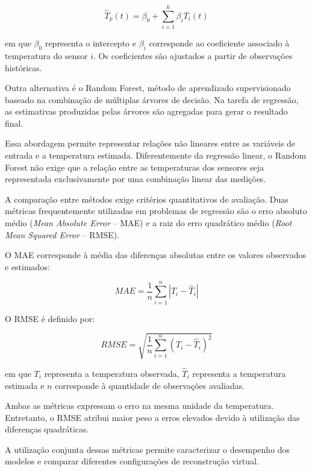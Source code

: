 \begin{equation}
    \hat{T}_{p}(t) =
    \beta_0 +
    \sum_{i=1}^{k} \beta_i T_i(t)
    \label{eq:regressao_linear}
\end{equation}

\noindent
em que $\beta_0$ representa o intercepto e $\beta_i$
corresponde ao coeficiente associado à temperatura
do sensor $i$. Os coeficientes são ajustados a partir
de observações históricas.

Outra alternativa é o Random Forest, método de aprendizado
supervisionado baseado na combinação de múltiplas árvores
de decisão. Na tarefa de regressão, as estimativas produzidas
pelas árvores são agregadas para gerar o resultado final.

Essa abordagem permite representar relações não lineares
entre as variáveis de entrada e a temperatura estimada.
Diferentemente da regressão linear, o Random Forest não
exige que a relação entre as temperaturas dos sensores
seja representada exclusivamente por uma combinação
linear das medições.

A comparação entre métodos exige critérios quantitativos
de avaliação. Duas métricas frequentemente utilizadas em
problemas de regressão são o erro absoluto médio
(\textit{Mean Absolute Error} -- MAE) e a raiz do erro
quadrático médio (\textit{Root Mean Squared Error} -- RMSE).

O MAE corresponde à média das diferenças absolutas
entre os valores observados e estimados:

\begin{equation}
    MAE =
    \frac{1}{n}
    \sum_{i=1}^{n}
    \left|T_i-\hat{T}_i\right|
    \label{eq:mae}
\end{equation}

O RMSE é definido por:

\begin{equation}
    RMSE =
    \sqrt{
        \frac{1}{n}
        \sum_{i=1}^{n}
        \left(T_i-\hat{T}_i\right)^2
    }
    \label{eq:rmse}
\end{equation}

\noindent
em que $T_i$ representa a temperatura observada, $\hat{T}_i$ representa a temperatura estimada e $n$ corresponde à quantidade de observações avaliadas.

Ambas as métricas expressam o erro na mesma unidade da temperatura. Entretanto, o RMSE atribui maior peso a erros elevados devido à utilização das diferenças quadráticas.

A utilização conjunta dessas métricas permite caracterizar o desempenho dos modelos e comparar diferentes configurações de reconstrução virtual.


